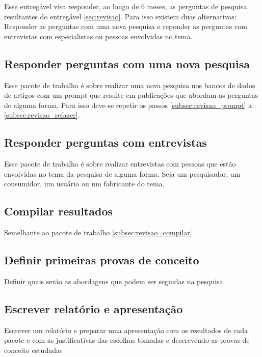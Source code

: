 Esse entregável visa responder, ao longo de 6 meses, as perguntas de pesquisa resultantes do entregável \ref{sec:revisao}. Para isso existem duas alternativas: Responder as perguntas com uma nova pesquisa e reponder as perguntas com entrevistas com especialistas ou pessoas envolvidas no tema.

\subsection{Responder perguntas com uma nova pesquisa}
\label{subsec:perguntas_pesquisa}

Esse pacote de trabalho é sobre realizar uma nova pesquisa nos bancos de dados de artigos com um prompt que resulte em publicações que abordam as perguntas de alguma forma. Para isso deve-se repetir os passos \ref{subsec:revisao_prompt} a \ref{subsec:revisao_refazer}.

\subsection{Responder perguntas com entrevistas}

Esse pacote de trabalho é sobre realizar entrevistas com pessoas que estão envolvidas no tema da pesquisa de alguma forma. Seja um pesquisador, um consumidor, um usuário ou um fabricante do tema.

\subsection{Compilar resultados}

Semelhante ao pacote de trabalho \ref{subsec:revisao_compilar}.

\subsection{Definir primeiras provas de conceito}

Definir quais serão as abordagens que podem ser seguidas na pesquisa.

\subsection{Escrever relatório e apresentação}

Escrever um relatório e preparar uma apresentação com os resultados de cada pacote e com as justificativas das escolhas tomadas e descrevendo as provas de conceito estudadas